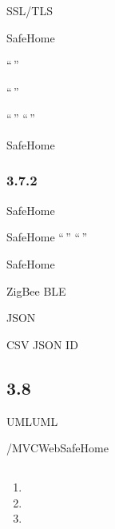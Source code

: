 SSL/TLS



SafeHome


``\,''

``\,''

``\,'' ``\,''

SafeHome

\hypertarget{section-57}{%
\subsubsection{3.7.2}\label{section-57}}

SafeHome



SafeHome ``\,'' ``\,''



SafeHome



ZigBee BLE


JSON


CSV JSON ID

\hypertarget{section-58}{%
\subsection{3.8}\label{section-58}}

UMLUML

/MVCWebSafeHome

\hypertarget{section-59}{%
\subsection{}\label{section-59}}

\hypertarget{section-60}{%
\subsubsection{}\label{section-60}}

\begin{enumerate}
\def\labelenumi{\arabic{enumi}.}
\tightlist
\item
\item
\item
\end{enumerate}

